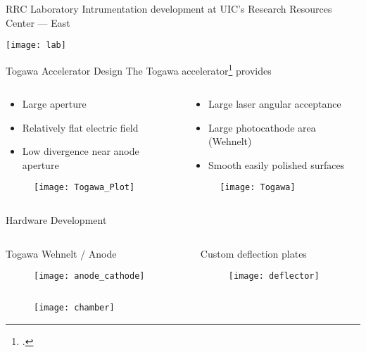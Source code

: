 \begin{frame}{RRC Laboratory}
  Intrumentation development at UIC's Research Resources Center --- East
  \begin{center}
    \texttt{[image: lab]}
  \end{center}
\end{frame}

\begin{frame}{Togawa Accelerator Design}
  The Togawa accelerator\footcite{togawa_ceb6_2007} provides
  \begin{columns}
    \begin{column}{0.49\linewidth}
      \begin{itemize}
        \item<2-> Large aperture
        \item<3-> Relatively flat electric field
        \item<4-> Low divergence near anode aperture
      \end{itemize}
      \begin{figure}
        \centering
        \texttt{[image: Togawa\_Plot]}
      \end{figure}
    \end{column}
    \begin{column}{0.49\linewidth}
      \begin{itemize}
        \item<5-> Large laser angular acceptance
        \item<5-> Large photocathode area (Wehnelt)
        \item<5-> Smooth easily polished surfaces
      \end{itemize}
      \begin{figure}
        \centering
        \texttt{[image: Togawa]}
      \end{figure}
    \end{column}
  \end{columns}
\end{frame}

\begin{frame}{Hardware Development}
  \begin{columns}
    \begin{column}{0.49\linewidth}
      Togawa Wehnelt / Anode
      \begin{figure}
        \centering
        \texttt{[image: anode\_cathode]}
      \end{figure}
    \end{column}
    \begin{column}{0.49\linewidth}
      Custom deflection plates
      \begin{figure}
        \centering
        \texttt{[image: deflector]}
      \end{figure}
    \end{column}
  \end{columns}
  \begin{figure}
    \centering
    \texttt{[image: chamber]}
  \end{figure}
\end{frame}

